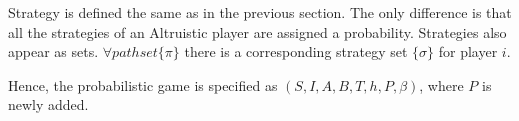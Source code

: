 Strategy is defined the same as in the previous section. The only difference is that all the strategies of an Altruistic player are assigned a probability. Strategies also appear as sets. $\forall path set \{\pi \}$
there is a corresponding strategy set $\{\sigma \}$ for player $i$. 


Hence, the probabilistic game is specified as $(S,I,A,B,T,h,P,\beta)$, where $P$ is newly added.






